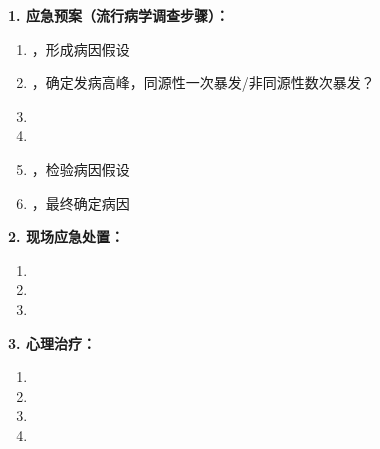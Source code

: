 \begin{keybox}
\textbf{1. 应急预案（流行病学调查步骤）：}

\begin{enumerate}[leftmargin=*]
    \item {}，形成病因假设
    \item {}，确定发病高峰，同源性一次暴发/非同源性数次暴发？
    \item {}
    \item {}
    \item {}，检验病因假设
    \item {}，最终确定病因
\end{enumerate}

\textbf{2. 现场应急处置：}

\begin{enumerate}[leftmargin=*]
    \item {}
    \item {}
    \item {}
\end{enumerate}

\textbf{3. 心理治疗：}

\begin{enumerate}[leftmargin=*]
    \item {}
    \item {}
    \item {}
    \item {}
\end{enumerate}
\end{keybox}

